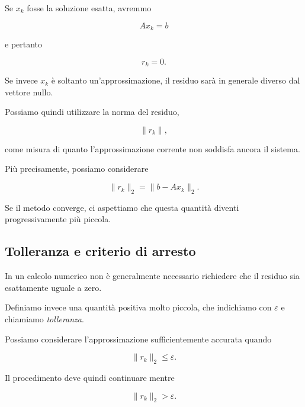 Se $x_k$ fosse la soluzione esatta, avremmo

\begin{equation*}
    Ax_k=b
\end{equation*}

e pertanto

\begin{equation*}
    r_k=0.
\end{equation*}

Se invece $x_k$ è soltanto un'approssimazione, il residuo sarà in
generale diverso dal vettore nullo.

Possiamo quindi utilizzare la norma del residuo,

\begin{equation*}
    \|r_k\|,
\end{equation*}

come misura di quanto l'approssimazione corrente non soddisfa
ancora il sistema.

Più precisamente, possiamo considerare

\begin{equation*}
    \|r_k\|_2
    =
    \|b-Ax_k\|_2.
    \label{eq:norma-residuo}
\end{equation*}

Se il metodo converge, ci aspettiamo che questa quantità diventi
progressivamente più piccola.


\subsection{Tolleranza e criterio di arresto}

In un calcolo numerico non è generalmente necessario richiedere
che il residuo sia esattamente uguale a zero.

Definiamo invece una quantità positiva molto piccola,
che indichiamo con $\varepsilon$ e chiamiamo \emph{tolleranza}.

Possiamo considerare l'approssimazione sufficientemente accurata
quando

\begin{equation*}
    \|r_k\|_2
    \leq
    \varepsilon.
    \label{eq:stopping-rule}
\end{equation*}

Il procedimento deve quindi continuare mentre

\begin{equation*}
    \|r_k\|_2
    >
    \varepsilon.
\end{equation*}

